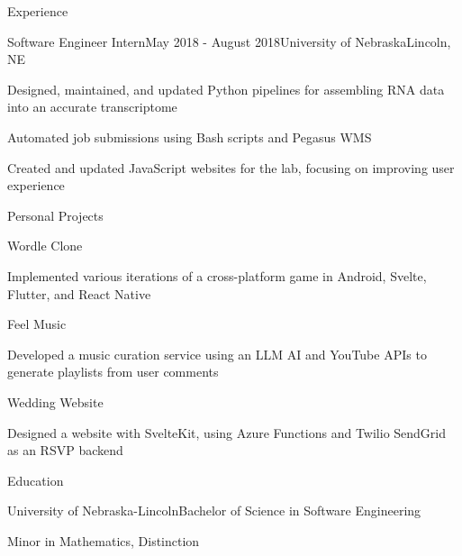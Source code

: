 \documentclass[
	10pt, %
]{article} %
\begin{document}
\begin{rSection}{Experience}
	\begin{rSubsection}{Software Engineer Intern}{May 2018 - August 2018}{University of Nebraska}{Lincoln, NE}
		\item Designed, maintained, and updated Python pipelines for assembling RNA data into an accurate transcriptome
		\item Automated job submissions using Bash scripts and Pegasus WMS
		\item Created and updated JavaScript websites for the lab, focusing on improving user experience
	\end{rSubsection}

\end{rSection}

\begin{rSection}{Personal Projects}

	\begin{rSubsection}{Wordle Clone}{}{}{}
		\item Implemented various iterations of a cross-platform game in Android, Svelte, Flutter, and React Native
	\end{rSubsection}

	\begin{rSubsection}{Feel Music}{}{}{}
		\item Developed a music curation service using an LLM AI and YouTube APIs to generate playlists from user comments
	\end{rSubsection}

	\begin{rSubsection}{Wedding Website}{}{}{}
		\item Designed a website with SvelteKit, using Azure Functions and Twilio SendGrid as an RSVP backend
	\end{rSubsection}

\end{rSection}

\begin{rSection}{Education}
	\begin{rSubsection}{University of Nebraska-Lincoln}{}{Bachelor of Science in Software Engineering}{}
		\item[] Minor in Mathematics, Distinction
	\end{rSubsection}
\end{rSection}





\end{document}
